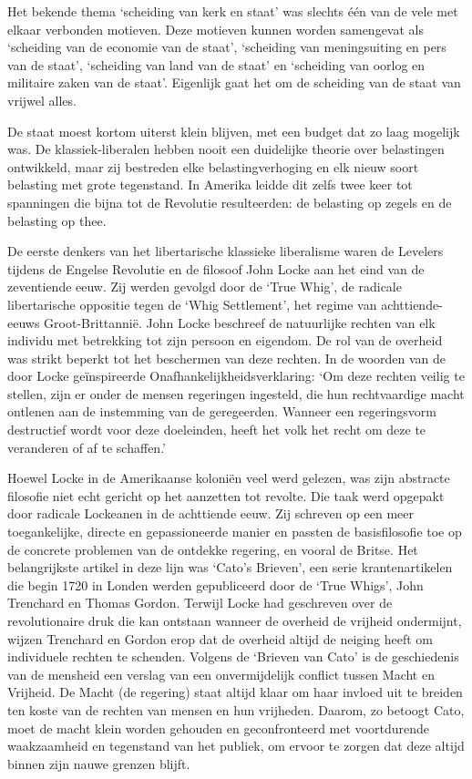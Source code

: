 \documentclass[
  a5paper,
  smalldemyvopaper,10pt,twoside,onecolumn,openright,extrafontsizes,hidelinks]{memoir}
\begin{document}
Het bekende thema `scheiding van kerk en staat' was slechts één van de
vele met elkaar verbonden motieven. Deze motieven kunnen worden
samengevat als `scheiding van de economie van de staat', `scheiding van
meningsuiting en pers van de staat', `scheiding van land van de staat'
en `scheiding van oorlog en militaire zaken van de staat'. Eigenlijk
gaat het om de scheiding van de staat van vrijwel alles.

De staat moest kortom uiterst klein blijven, met een budget dat zo laag
mogelijk was. De klassiek-liberalen hebben nooit een duidelijke theorie
over belastingen ontwikkeld, maar zij bestreden elke belastingverhoging
en elk nieuw soort belasting met grote tegenstand. In Amerika leidde dit
zelfs twee keer tot spanningen die bijna tot de Revolutie resulteerden:
de belasting op zegels en de belasting op thee.

De eerste denkers van het libertarische klassieke liberalisme waren de
Levelers tijdens de Engelse Revolutie en de filosoof John Locke aan het
eind van de zeventiende eeuw. Zij werden gevolgd door de `True Whig', de
radicale libertarische oppositie tegen de `Whig Settlement', het regime
van achttiende-eeuws Groot-Brittannië. John Locke beschreef de
natuurlijke rechten van elk individu met betrekking tot zijn persoon en
eigendom. De rol van de overheid was strikt beperkt tot het beschermen
van deze rechten. In de woorden van de door Locke geïnspireerde
Onafhankelijkheidsverklaring: `Om deze rechten veilig te stellen, zijn
er onder de mensen regeringen ingesteld, die hun rechtvaardige macht
ontlenen aan de instemming van de geregeerden. Wanneer een regeringsvorm
destructief wordt voor deze doeleinden, heeft het volk het recht om deze
te veranderen of af te schaffen.'

Hoewel Locke in de Amerikaanse koloniën veel werd gelezen, was zijn
abstracte filosofie niet echt gericht op het aanzetten tot revolte. Die
taak werd opgepakt door radicale Lockeanen in de achttiende eeuw. Zij
schreven op een meer toegankelijke, directe en gepassioneerde manier en
passten de basisfilosofie toe op de concrete problemen van de ontdekke
regering, en vooral de Britse. Het belangrijkste artikel in deze lijn
was `Cato's Brieven', een serie krantenartikelen die begin 1720 in
Londen werden gepubliceerd door de `True Whigs', John Trenchard en
Thomas Gordon. Terwijl Locke had geschreven over de revolutionaire druk
die kan ontstaan wanneer de overheid de vrijheid ondermijnt, wijzen
Trenchard en Gordon erop dat de overheid altijd de neiging heeft om
individuele rechten te schenden. Volgens de `Brieven van Cato' is de
geschiedenis van de mensheid een verslag van een onvermijdelijk conflict
tussen Macht en Vrijheid. De Macht (de regering) staat altijd klaar om
haar invloed uit te breiden ten koste van de rechten van mensen en hun
vrijheden. Daarom, zo betoogt Cato, moet de macht klein worden gehouden
en geconfronteerd met voortdurende waakzaamheid en tegenstand van het
publiek, om ervoor te zorgen dat deze altijd binnen zijn nauwe grenzen
blijft.
\end{document}
